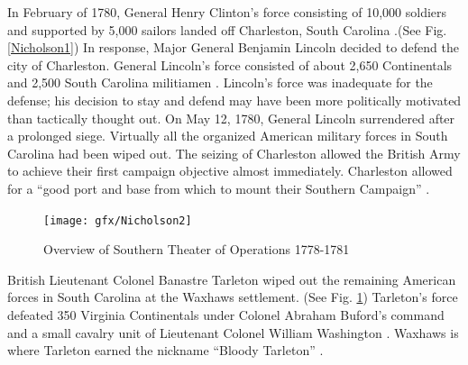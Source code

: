 In February of 1780, General Henry Clinton’s force consisting of 10,000 soldiers
and supported by 5,000 sailors landed off Charleston, South Carolina
\cite[p.6]{weigley_partisan_1970}.(See Fig. \ref{Nicholson1})
In response, Major General Benjamin Lincoln decided to defend the city of
Charleston.  General Lincoln’s force consisted of about 2,650 Continentals and
2,500 South Carolina militiamen \cite[p.6]{weigley_partisan_1970}.  Lincoln’s
force was inadequate for the defense; his decision to stay and defend may have
been more politically motivated than tactically thought out.  On May 12, 1780,
General Lincoln surrendered after a prolonged siege.  Virtually all the
organized American military forces in South Carolina had been wiped out.  The
seizing of Charleston allowed the British Army to achieve their first campaign
objective almost immediately.  Charleston allowed for a “good port and base from
which to mount their Southern Campaign” \cite[p.22]{woodward_comparative_2002}.

\begin{figure}[h]
\begin{center}
\texttt{[image: gfx/Nicholson2]}
\end{center}
\caption{Overview of Southern Theater of Operations 1778-1781 \cite[Tab D, Map 1]{rauch_battle_2007}}
\label{Nicholson2}
\end{figure}

British Lieutenant Colonel Banastre Tarleton wiped out the remaining American
forces in South Carolina at the Waxhaws settlement.  (See Fig. \ref{Nicholson2})
Tarleton’s force defeated 350 Virginia Continentals under Colonel Abraham
Buford’s command and a small cavalry unit of Lieutenant Colonel William
Washington \cite[p.7]{weigley_partisan_1970}.  Waxhaws is where Tarleton earned the nickname
“Bloody Tarleton” \cite[p.20]{moncure_cowpens_1996}.

